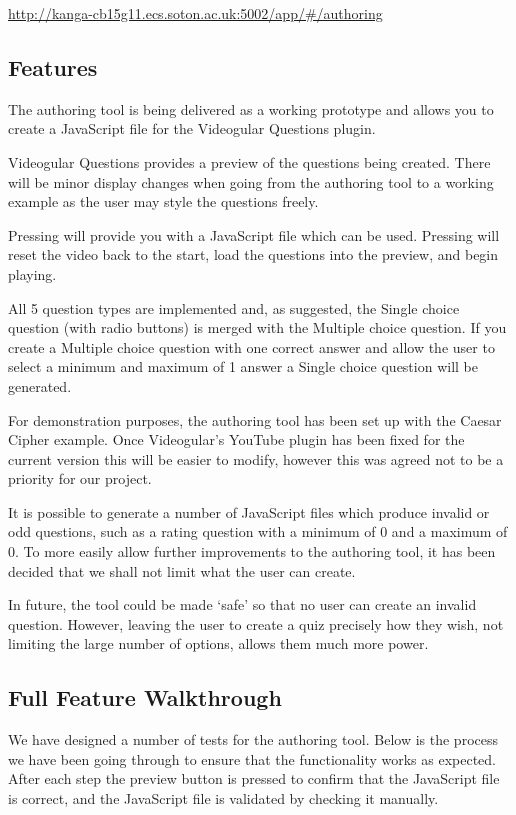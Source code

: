 \documentclass[12pt,a4paper]{article}
\begin{document}
\url{http://kanga-cb15g11.ecs.soton.ac.uk:5002/app/#/authoring}

\subsection{Features}

The authoring tool is being delivered as a working prototype and allows you to create a JavaScript file for the Videogular Questions plugin.

Videogular Questions provides a preview of the questions being created. There will be minor display changes when going from the authoring tool to a working example as the user may style the questions freely.

Pressing  will provide you with a JavaScript file which can be used. Pressing  will reset the video back to the start, load the questions into the preview, and begin playing.

All 5 question types are implemented and, as suggested, the Single choice question (with radio buttons) is merged with the Multiple choice question. If you create a Multiple choice question with one correct answer and allow the user to select a minimum and maximum of 1 answer a Single choice question will be generated.

For demonstration purposes, the authoring tool has been set up with the Caesar Cipher example. Once Videogular's YouTube plugin has been fixed for the current version this will be easier to modify, however this was agreed not to be a priority for our project.

It is possible to generate a number of JavaScript files which produce invalid or odd questions, such as a rating question with a minimum of 0 and a maximum of 0. To more easily allow further improvements to the authoring tool, it has been decided that we shall not limit what the user can create.

In future, the tool could be made `safe' so that no user can create an invalid question. However, leaving the user to create a quiz precisely how they wish, not limiting the large number of options, allows them much more power.

\subsection{Full Feature Walkthrough}

We have designed a number of tests for the authoring tool. Below is the process we have been going through to ensure that the functionality works as expected. After each step the preview button is pressed to confirm that the JavaScript file is correct, and the JavaScript file is validated by checking it manually.
\end{document}
